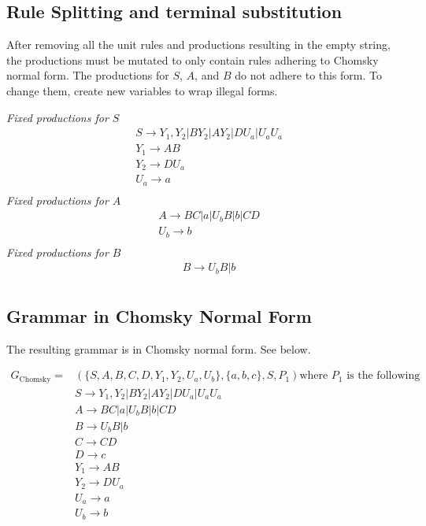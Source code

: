 \documentclass{assignment-x}
\begin{document}
\subsection{Rule Splitting and terminal substitution}
After removing all the unit rules and productions resulting in the empty string, the productions must be mutated to only contain rules adhering to Chomsky normal form. The productions for $S$, $A$, and $B$ do not adhere to this form. To change them, create new variables to wrap illegal forms.

\begin{center}
    \textit{Fixed productions for $S$}
    \begin{align*}
        &S \rightarrow Y_1, Y_2|BY_2|AY_2|DU_a|U_aU_a \\
        &Y_1 \rightarrow AB \\
        &Y_2 \rightarrow DU_a \\
        &U_a \rightarrow a \\
    \end{align*}
    \textit{Fixed productions for $A$}
    \begin{align*}
        &A \rightarrow BC|a|U_bB|b|CD \\
        &U_b \rightarrow b \\
    \end{align*}
    \textit{Fixed productions for $B$}
    \begin{align*}
        &B \rightarrow U_bB|b \\
    \end{align*}
\end{center}

\subsection{Grammar in Chomsky Normal Form}
The resulting grammar is in Chomsky normal form. See below.

\begin{align*}
    G_{\text{Chomsky}}=&(\{S,A,B,C,D,Y_1,Y_2,U_a, U_b\},\{a,b,c\}, S, P_1)\text{where $P_1$ is the following}\\
    &S \rightarrow Y_1, Y_2|BY_2|AY_2|DU_a|U_aU_a \\
    &A \rightarrow BC|a|U_bB|b|CD \\
    &B \rightarrow U_bB|b \\
    &C \rightarrow CD\\
    &D \rightarrow c\\
    &Y_1 \rightarrow AB \\
    &Y_2 \rightarrow DU_a \\
    &U_a \rightarrow a \\
    &U_b \rightarrow b \\
\end{align*}
\end{document}
